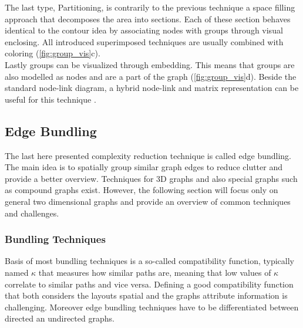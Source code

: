The last type, Partitioning, is contrarily to the previous technique a space filling approach that decomposes the area into sections. Each of these section behaves identical to the contour idea by associating nodes with groups through visual enclosing. All introduced superimposed techniques are usually combined with coloring (\autoref{fig:group_vis}c).\\
Lastly groups can be visualized through embedding. This means that groups are also modelled as nodes and are a part of the graph (\autoref{fig:group_vis}d). Beside the standard node-link diagram, a hybrid node-link and matrix representation can be useful for this technique \cite{Vehlow2015}.\\

\subsection{Edge Bundling}
The last here presented complexity reduction technique is called edge bundling. The main idea is to spatially group similar graph edges to reduce clutter and provide a better overview. Techniques for 3D graphs and also special graphs such as compound graphs exist. However, the following section will focus only on general two dimensional graphs and provide an overview of common techniques and challenges.

\subsubsection{Bundling Techniques}
Basis of most bundling techniques is a so-called compatibility function, typically named $\kappa$ that measures how similar paths are, meaning that low values of $\kappa$ correlate to similar paths and vice versa. Defining a good compatibility function that both considers the layouts spatial and the graphs attribute information is challenging. Moreover edge bundling techniques have to be differentiated between directed an undirected graphs\cite{Lhuillier2017}.

